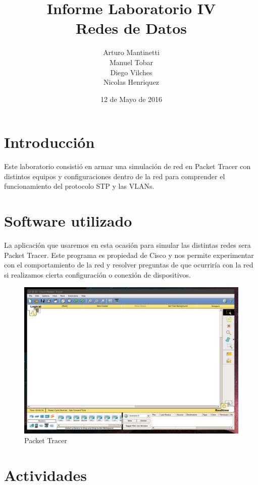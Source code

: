 \documentclass[spanish]{udpreport}
\title{Informe Laboratorio IV \\ Redes de Datos}
\author{Arturo Mantinetti \\ Manuel Tobar \\ Diego Vilches \\ Nicolas Henriquez}
\date{12 de Mayo de 2016}
\begin{document}
\maketitle

\tableofcontents

\chapter{Introducción}

Este laboratorio consistió en armar una simulación de red en Packet Tracer con distintos equipos y configuraciones dentro de la red para comprender el funcionamiento del protocolo STP y las VLANs.

\chapter{Software utilizado}
La aplicación que usaremos en esta ocasión para simular las distintas redes sera Packet Tracer. Este programa es propiedad de Cisco y nos permite experimentar con el comportamiento de la red y resolver preguntas de que ocurriría con la red si realizamos cierta configuración o conexión de dispositivos.

\begin{figure}[H]
	\centering
	\includegraphics[scale=.25]{imagenes/A0e.png}
	\caption{Packet Tracer}
	\label{fig:Figura 1.1}
\end{figure}


\chapter{Actividades}
\end{document}
